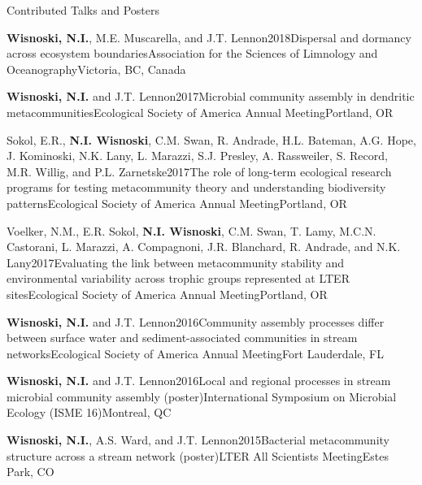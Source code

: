 \documentclass{resume} %
\begin{document}
\bigskip

\begin{rhangSection}{Contributed Talks and Posters}

  \begin{Presentation}{{\bf Wisnoski, N.I.}, M.E. Muscarella, and J.T. Lennon}{2018}{Dispersal and dormancy across ecosystem boundaries}{Association for the Sciences of Limnology and Oceanography}{Victoria, BC, Canada}
  \end{Presentation}

  \begin{Presentation}{{\bf Wisnoski, N.I.} and J.T. Lennon}{2017}{Microbial community assembly in dendritic metacommunities}{Ecological Society of America Annual Meeting}{Portland, OR}
  \end{Presentation}
  
  \begin{Presentation}{Sokol, E.R., {\bf N.I. Wisnoski}, C.M. Swan, R. Andrade, H.L. Bateman, A.G. Hope, J. Kominoski, N.K. Lany, L. Marazzi, S.J. Presley, A. Rassweiler, S. Record, M.R. Willig, and P.L.
Zarnetske}{2017}{The role of long-term ecological research programs for testing
metacommunity theory and understanding biodiversity patterns}{Ecological Society of
America Annual Meeting}{Portland, OR}
  \end{Presentation}
  
  \begin{Presentation}{Voelker, N.M., E.R. Sokol, {\bf N.I. Wisnoski}, C.M. Swan, T. Lamy, M.C.N. Castorani, L. Marazzi, A. Compagnoni, J.R. Blanchard, R. Andrade, and N.K. Lany}{2017}{Evaluating the link between metacommunity stability and environmental variability across trophic groups represented at LTER sites}{Ecological Society of America Annual Meeting}{Portland, OR}
  \end{Presentation}

  \begin{Presentation}{{\bf Wisnoski, N.I.} and J.T. Lennon}{2016}{Community assembly processes differ between surface water and sediment-associated communities in stream networks}{Ecological Society of America Annual Meeting}{Fort Lauderdale, FL}
  \end{Presentation}

  \begin{Presentation}{{\bf Wisnoski, N.I.} and J.T. Lennon}{2016}{Local and regional processes in stream microbial community assembly (poster)}{International Symposium on Microbial Ecology (ISME 16)}{Montreal, QC}
  \end{Presentation}

  \begin{Presentation}{{\bf Wisnoski, N.I.}, A.S. Ward, and J.T. Lennon}{2015}{Bacterial metacommunity structure across a stream network (poster)}{LTER All Scientists Meeting}{Estes Park, CO}
  \end{Presentation}

\end{rhangSection}
\end{document}

